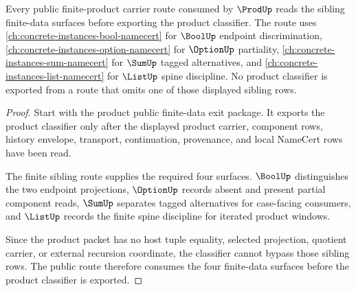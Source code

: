 \begin{theorem}
\label{thm:prod-bool-option-sum-list-sibling-route}
Every public finite-product carrier route consumed by $\ProdUp$ reads the sibling finite-data surfaces before exporting the product classifier. The route uses \autoref{ch:concrete-instances-bool-namecert} for $\BoolUp$ endpoint discrimination, \autoref{ch:concrete-instances-option-namecert} for $\OptionUp$ partiality, \autoref{ch:concrete-instances-sum-namecert} for $\SumUp$ tagged alternatives, and \autoref{ch:concrete-instances-list-namecert} for $\ListUp$ spine discipline. No product classifier is exported from a route that omits one of those displayed sibling rows.
\end{theorem}
\begin{proof}
Start with the product public finite-data exit package. It exports the product classifier only after the displayed product carrier, component rows, history envelope, transport, continuation, provenance, and local NameCert rows have been read.

The finite sibling route supplies the required four surfaces. $\BoolUp$ distinguishes the two endpoint projections, $\OptionUp$ records absent and present partial component reads, $\SumUp$ separates tagged alternatives for case-facing consumers, and $\ListUp$ records the finite spine discipline for iterated product windows.

Since the product packet has no host tuple equality, selected projection, quotient carrier, or external recursion coordinate, the classifier cannot bypass those sibling rows. The public route therefore consumes the four finite-data surfaces before the product classifier is exported.
\end{proof}
